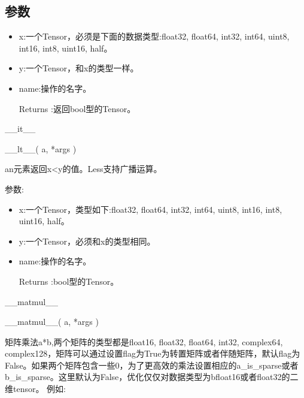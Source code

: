 \subsection{参数}
\begin{itemize}
	\item x:一个Tensor，必须是下面的数据类型:float32, float64, int32, int64, uint8, int16, int8, uint16, half。
	\item y:一个Tensor，和x的类型一样。
	\item name:操作的名字。
	\item[Returns]:返回bool型的Tensor。
	\end{itemize}

\_\_it\_\_\newline
\begin{python}
__lt__(
    a,
    *args
)
\end{python}
an元素返回x<y的值。Less支持广播运算。

参数:
\begin{itemize}
	\item x:一个Tensor，类型如下:float32, float64, int32, int64, uint8, int16, int8, uint16, half。
	\item y:一个Tensor，必须和x的类型相同。
	\item name:操作的名字。
	\item[Returns]:bool型的Tensor。
\end{itemize}

\_\_matmul\_\_\newline
\begin{python}
__matmul__(
    a,
    *args
)
\end{python}
矩阵乘法a*b,两个矩阵的类型都是float16, float32, float64, int32, complex64, complex128，矩阵可以通过设置flag为True为转置矩阵或者伴随矩阵，默认flag为False。如果两个矩阵包含一些0，为了更高效的乘法设置相应的a\_is\_sparse或者b\_is\_sparse。这里默认为False，优化仅仅对数据类型为bfloat16或者float32的二维tensor。
例如:

